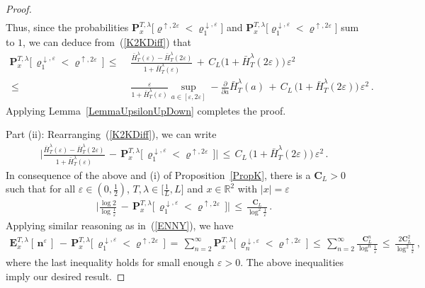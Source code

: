 \documentclass[10pt]{article}
\numberwithin{equation}{section}
\theoremstyle{definition}
\newcommand{\R}{{\mathbb R}}
\begin{document}
\begin{proof}
\begin{align}
\end{align}
Thus, since the probabilities $\mathbf{P}^{T,\lambda }_x\big[\varrho^{\uparrow, 2\varepsilon}<\varrho^{\downarrow, \varepsilon}_1\big] $ and 
 $\mathbf{P}^{T,\lambda }_x\big[\varrho^{\downarrow, \varepsilon}_1<\varrho^{\uparrow, 2\varepsilon}\big] $ sum to $1$, we can deduce from~(\ref{K2KDiff}) that
\begin{align*}
   \mathbf{P}^{T,\lambda }_x\Big[\,\varrho^{\downarrow, \varepsilon}_1<\varrho^{\uparrow, 2\varepsilon}\,\Big]  \,\leq\,&\, \frac{ \bar{H}^{\lambda}_T(\varepsilon )- \bar{H}^{\lambda}_{T }(2\varepsilon)  }{1+ \bar{H}^{\lambda}_T(\varepsilon )  } \,+\,C_L\Big(  1+ \bar{H}^{\lambda}_{T }(2\varepsilon)   \Big)\,\varepsilon^2 \nonumber \\ 
   \,\leq\,&\, \frac{ \varepsilon }{1+ \bar{H}^{\lambda}_T(\varepsilon )  } \sup_{a\in [\varepsilon, 2\varepsilon ]} -\frac{\partial}{\partial a}\bar{H}^{\lambda}_T(a )  \,+\,C_L\,\Big(  1+ \bar{H}^{\lambda}_{T }(2\varepsilon)   \Big)\,\varepsilon^2\,.
\end{align*}
Applying Lemma~\ref{LemmaUpsilonUpDown} completes the proof.


\vspace{.5cm}

\noindent Part (ii):  Rearranging~(\ref{K2KDiff}), we can write 
\begin{align*}
    \bigg|  \frac{ \bar{H}^{\lambda}_T(\varepsilon )- \bar{H}^{\lambda}_{T }(2\varepsilon)  }{1+ \bar{H}^{\lambda}_T(\varepsilon )  }   \,-\,\mathbf{P}^{T,\lambda }_x\Big[\,\varrho^{\downarrow, \varepsilon}_1 <\varrho^{\uparrow, 2\varepsilon}\,\Big] \bigg| \,\leq\, C_L\,\Big(1+ \bar{H}^{\lambda}_{T }(2\varepsilon)  \Big)\,\varepsilon^2\,.
\end{align*}
In consequence of the above and (i) of Proposition~\ref{PropK},  there is a $\mathbf{C}_L>0$ such that for all $\varepsilon \in (0,\frac{1}{2})$, $T,\lambda\in \big[\frac{1}{L}, L]$ and  $x\in \R^2 $ with $|x|=\varepsilon$
\begin{align*}
\bigg|\frac{ \log 2  }{\log  \frac{1}{\varepsilon}  }  \,-\, \mathbf{P}^{T,\lambda }_x\Big[ \,\varrho^{\downarrow, \varepsilon}_1 < \varrho^{\uparrow, 2\varepsilon}  \,\Big] \bigg| \,\leq \, \frac{ \mathbf{C}_L}{\log^2 \frac{1}{\varepsilon}  }\,. 
\end{align*}
Applying similar reasoning as in~(\ref{ENNY}), we have
\begin{align*}
    \mathbf{E}_{x}^{T,\lambda}[ \,\mathbf{n}^{\varepsilon}\, ]\,-\,\mathbf{P}^{T,\lambda }_x\Big[ \,\varrho^{\downarrow, \varepsilon}_1< \varrho^{\uparrow, 2\varepsilon} \, \Big]\,=\, \sum_{n=2}^{\infty} \mathbf{P}^{T,\lambda }_x\Big[\, \varrho^{\downarrow, \varepsilon}_n< \varrho^{\uparrow, 2\varepsilon} \, \Big]\,\leq\,\sum_{n=2}^{\infty} \frac{ \mathbf{C}_L^n }{\log^n \frac{1}{\varepsilon} } \,\leq \,\frac{ 2\mathbf{C}_L^2 }{\log^2\frac{1}{\varepsilon} }\,,
\end{align*}
where the last inequality holds for small enough $\varepsilon>0$.  The above inequalities imply our desired result.
\end{proof}
\end{document}
